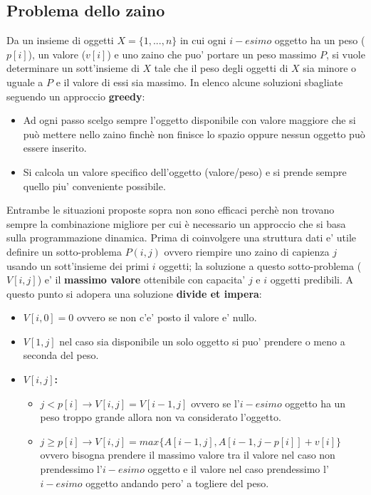 \documentclass{article}
\begin{document}
\subsection{Problema dello zaino}
Da un insieme di oggetti $X=\{1,...,n\}$ in cui ogni $i-esimo$ oggetto ha un peso ($p[i]$), un valore ($v[i]$) e uno zaino che puo' portare un peso massimo $P$,
si vuole determinare un sott'insieme di $X$ tale che il peso degli oggetti di $X$ sia minore o uguale a $P$ e il valore di essi sia massimo.
In elenco alcune soluzioni sbagliate seguendo un approccio \textbf{greedy}:
\begin{itemize}
    \item Ad ogni passo scelgo sempre l'oggetto disponibile con valore maggiore che si può mettere nello zaino finchè non finisce lo spazio oppure nessun oggetto può essere inserito.
    \item Si calcola un valore specifico dell'oggetto (valore/peso) e si prende sempre quello piu' conveniente possibile.
\end{itemize}
Entrambe le situazioni proposte sopra non sono efficaci perchè non trovano sempre la combinazione migliore per cui è necessario un approccio che si basa sulla programmazione dinamica.
Prima di coinvolgere una struttura dati e' utile definire un sotto-problema $P(i,j)$ ovvero riempire uno zaino di capienza $j$ usando un sott'insieme dei primi $i$ oggetti;
la soluzione a questo sotto-problema ($V[i,j]$) e' il \textbf{massimo valore} ottenibile con capacita' $j$ e $i$ oggetti predibili.
A questo punto si adopera una soluzione \textbf{divide et impera}:
\begin{itemize}
\item \textbf{$V[i,0] = 0$} ovvero se non c'e' posto il valore e' nullo.
\item \textbf{$V[1,j]$} nel caso sia disponibile un solo oggetto si puo' prendere o meno a seconda del peso.
\item \textbf{$V[i,j]$:} 
        \begin{itemize}
            \item \textbf{$j < p[i] \rightarrow V[i,j] = V[i-1,j]$} ovvero se l'$i-esimo$ oggetto ha un peso troppo grande allora non va considerato l'oggetto.
            \item \textbf{$j \geq p[i] \rightarrow V[i,j] = max\{ A[i-1, j], A[i-1, j-p[i]] + v[i]\}$}   ovvero bisogna prendere il massimo valore tra il valore nel caso non prendessimo l'$i-esimo$ oggetto
                    e il valore nel caso prendessimo l'$i-esimo$ oggetto andando pero' a togliere del peso.
        \end{itemize}  
\end{itemize}
\end{document}
